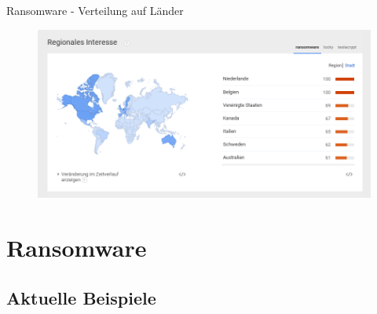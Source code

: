 \documentclass[10pt]{beamer}
\begin{document}

\begin{frame}{Ransomware - Verteilung auf Länder}
	\begin{figure}[p]
		\centering
		\includegraphics[scale=0.37]{ransomware_laenderverteilung.png}
	\end{figure}
\end{frame}


\section{Ransomware}
\subsection{Aktuelle Beispiele}
\end{document}
